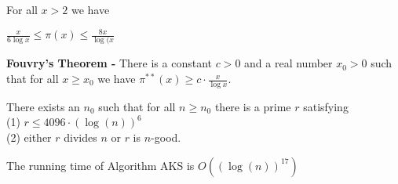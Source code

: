 \documentclass[a4paper]{article}
\begin{document}
\begin{theorem}
For all $x > 2$ we have 
\begin{center}
$\frac{x}{6\log{x}} \leq \pi (x) \leq \frac{8x}{\log(x}$
\end{center}
\end{theorem}


\begin{theorem}
\textbf{Fouvry's Theorem -} There is a constant $c > 0$ and a real number $x_{0} > 0 $ such that for all $x \geq x_{0}$ we have $\pi^{**} (x) \geq c \cdot \frac{x}{\log{x}}$.
\end{theorem}


\begin{lemma}
There exists an $n_{0}$ such that for all $n \geq n_{0}$ there is a prime $r$ satisfying\\
(1) $r \leq 4096 \cdot (\log(n))^{6}$ \\
(2) either $r$ divides $n$ or $r$ is $n$-good.
\end{lemma}


\begin{theorem}
The running time of Algorithm AKS is $O\left( (\log(n))^{17} \right)$
\end{theorem}
\end{document}
